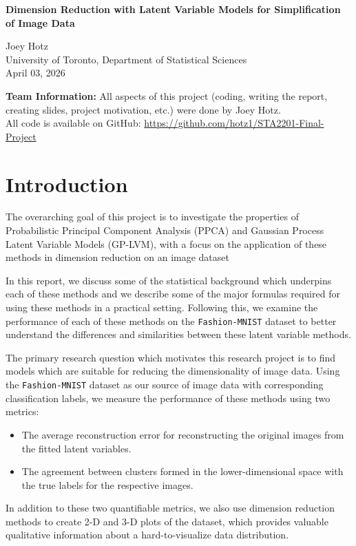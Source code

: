 \documentclass[12pt]{article}
\numberwithin{equation}{section}
\numberwithin{figure}{section}
\numberwithin{table}{section}
\newcommand{\FMNIST}{\texttt{Fashion-MNIST}}
\begin{document}
\begin{center}
    {\LARGE{\textbf{Dimension Reduction with Latent Variable Models for Simplification of Image Data}}}
    \vspace*{2cm}

    {\Large{Joey Hotz}}\\
    \vspace*{1cm}
    {\large{University of Toronto, Department of Statistical Sciences}}\\
    \vspace*{1cm}
    {\large{April 03, 2026}}

    \vfill

    \textbf{Team Information:} All aspects of this project (coding, writing the report, creating slides, project motivation, etc.) were done by Joey Hotz.\\
    \vspace*{0.5cm}
    All code is available on GitHub: \url{https://github.com/hotz1/STA2201-Final-Project}
\end{center}
\thispagestyle{empty}
\clearpage

\setcounter{page}{1}

\section{Introduction}\label{sec:intro}

The overarching goal of this project is to investigate the properties of Probabilistic Principal Component Analysis (PPCA) and Gaussian Process Latent Variable Models (GP-LVM), with a focus on the application of these methods in dimension reduction on an image dataset 

In this report, we discuss some of the statistical background which underpins each of these methods and we describe some of the major formulas required for using these methods in a practical setting. Following this, we examine the performance of each of these methods on the \FMNIST{} dataset \citep{Fashion-MNIST} to better understand the differences and similarities between these latent variable methods. 

The primary research question which motivates this research project is to find models which are suitable for reducing the dimensionality of image data. Using the \FMNIST{} dataset as our source of image data with corresponding classification labels, we measure the performance of these methods using two metrics:
\begin{itemize}[label=]
    \item The average reconstruction error for reconstructing the original images from the fitted latent variables.
    \item The agreement between clusters formed in the lower-dimensional space with the true labels for the respective images.
\end{itemize}
In addition to these two quantifiable metrics, we also use dimension reduction methods to create 2-D and 3-D plots of the dataset, which provides valuable qualitative information about a hard-to-visualize data distribution.  
\end{document}

